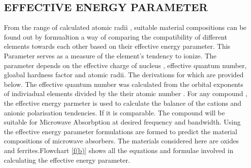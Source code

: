 \documentclass[journal]{IEEEtran}
\begin{document}
\subsection{EFFECTIVE ENERGY PARAMETER}
From the range of calculated atomic radii , suitable material compositions can be found out by formualtion a way of comparing the compatibility of different elements towards each other based on their effective energy parameter\cite{korablev2018calculations}. This Parameter serves as a measure of the element's tendency to ionize. The parameter depends on the effective charge of nucleus , effective quantum number, gloabal hardness factor and atomic radii. The derivations for which are provided below. The effective quantum number was calculated from the orbital exponents of indiviadual elements divided by the their atomic number \cite{clementi1963atomic} .
For any compound , the effective energy parmeter is used to calculate the balance of the cations and anionic polarisation tendencies. If it is comparable. The compound will be suitable for Microwave Absorbption at desired frequency and bandwidth.
Using the effective energy parameter formulations are formed to predict the material compositions of microwave absorbers.  The materials considered here are oxides and ferrites.Flowchart \ref{f(b)} shows all the equations and formulae involved in calculating the effective energy parameter.
\end{document}
